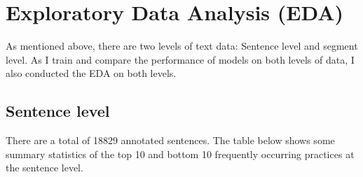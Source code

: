 
\chapter{Exploratory Data Analysis (EDA)} %

\label{chapter3} %

As mentioned above, there are two levels of text data: Sentence level and segment level. As I train and compare the performance of models on both levels of data, I also conducted the EDA on both levels.


\section{Sentence level}

There are a total of 18829 annotated sentences. The table below shows some summary statistics of the top 10 and bottom 10 frequently occurring practices at the sentence level. 

